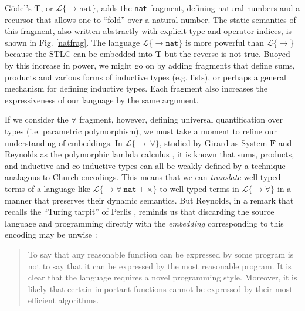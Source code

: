 G\"odel's $\mathbf{T}$, or  $\mathcal{L}\{\rightarrow \mathtt{nat}\}$, adds the \verb|nat| fragment, defining natural numbers and a recursor that allows one to ``fold'' over a natural number. The static semantics of this fragment, also written abstractly with explicit type and operator indices, is shown in Fig. \ref{natfrag}. The language $\mathcal{L}\{\rightarrow \mathtt{nat}\}$ is  more powerful than $\mathcal{L}\{\rightarrow\}$ because the STLC can be embedded  into  $\mathbf{T}$ but the reverse is not true. Buoyed by this increase in power, we might go on by adding fragments that define sums, products and various forms of inductive types (e.g. lists), or perhaps a general mechanism for defining inductive types. Each fragment also increases the expressiveness of our language by the same argument.

If we consider the $\forall$ fragment, however, defining universal quantification over types (i.e. parametric polymorphism), we must take a moment to refine our understanding of embeddings. In $\mathcal{L}\{\rightarrow\,\forall\}$, studied by Girard as System $\mathbf{F}$ \cite{girard1971extension} and Reynolds as the polymorphic lambda calculus \cite{Reynolds94anintroduction}, it is known that sums, products, and inductive and co-inductive types can all be weakly defined by a technique analagous to Church encodings. This means that we can \emph{translate} well-typed terms of a language like $\mathcal{L}\{\rightarrow\forall~\mathtt{nat} + \times\}$ to well-typed terms in $\mathcal{L}\{\rightarrow\forall\}$ in a manner that preserves their dynamic semantics. But Reynolds, in a remark that recalls the ``Turing tarpit'' of Perlis \cite{Perl82a}, reminds us that discarding the source language and programming directly with the \emph{embedding} corresponding to this encoding may be unwise \cite{Reynolds94anintroduction}: 
\begin{quote}
To say that any reasonable function can be expressed by some program is not to say that it can be expressed by the most reasonable program. It is clear that the language requires a novel programming style. Moreover, it is likely that certain important functions cannot be expressed by their most efficient algorithms.
\end{quote}

